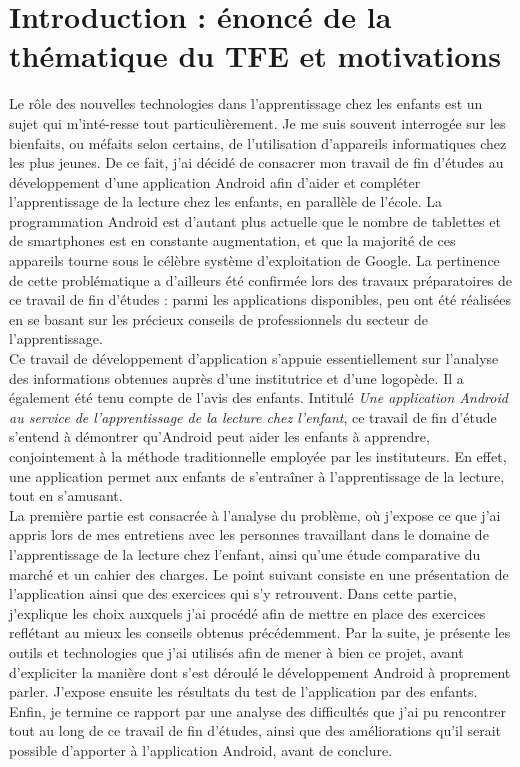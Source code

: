 \section{Introduction : énoncé de la thématique du TFE et motivations}
Le rôle des nouvelles technologies dans l'apprentissage chez les enfants est un sujet qui m'inté-resse tout particulièrement. Je me suis souvent interrogée sur les bienfaits, ou méfaits selon certains, de l'utilisation d'appareils informatiques chez les plus jeunes. De ce fait, j'ai décidé de consacrer mon travail de fin d'études au développement d'une application Android afin d'aider et compléter l'apprentissage de la lecture chez les enfants, en parallèle de l'école. La programmation Android est d'autant plus actuelle que le nombre de tablettes et de smartphones est en constante augmentation, et que la majorité de ces appareils tourne sous le célèbre système d'exploitation de Google. La pertinence de cette problématique a d'ailleurs été confirmée lors des travaux préparatoires de ce travail de fin d'études : parmi les applications disponibles, peu ont été réalisées en se basant sur les précieux conseils de professionnels du secteur de l'apprentissage.\\

Ce travail de développement d'application s'appuie essentiellement sur l'analyse des informations obtenues auprès d'une institutrice et d'une logopède. Il a également été tenu compte de l'avis des enfants. Intitulé \textit{Une application Android au service de l'apprentissage de la lecture chez l'enfant}, ce travail de fin d'étude s'entend à démontrer qu'Android peut aider les enfants à apprendre, conjointement à la méthode traditionnelle employée par les instituteurs. En effet, une application permet aux enfants de s'entraîner à l'apprentissage de la lecture, tout en s'amusant.\\

La première partie est consacrée à l'analyse du problème, où j'expose ce que j'ai appris lors de mes entretiens avec les personnes travaillant dans le domaine de l'apprentissage de la lecture chez l'enfant, ainsi qu'une étude comparative du marché et un cahier des charges. Le point suivant consiste en une présentation de l'application ainsi que des exercices qui s'y retrouvent. Dans cette partie, j'explique les choix auxquels j'ai procédé afin de mettre en place des exercices reflétant au mieux les conseils obtenus précédemment. Par la suite, je présente les outils et technologies que j'ai utilisés afin de mener à bien ce projet, avant d'expliciter la manière dont s'est déroulé le développement Android à proprement parler. J'expose ensuite les résultats du test de l'application par des enfants. Enfin, je termine ce rapport par une analyse des difficultés que j'ai pu rencontrer tout au long de ce travail de fin d'études, ainsi que des améliorations qu'il serait possible d'apporter à l'application Android, avant de conclure.